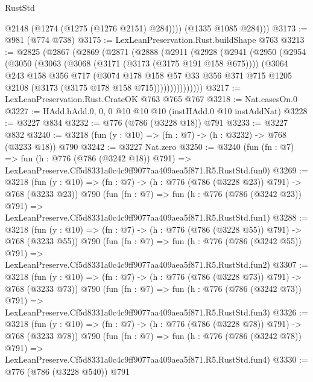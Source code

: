 \begin{lexlean}{RustStd}
\begin{coremodule}
            @2148
            (@1274 (@1275 (@1276 @2151) @284))))
        (@1335 @1085 @284)))
@3173 := @981 (@774 @738)
@3175 := LexLeanPreservation.Rust.buildShape @763
@3213 := @2825
    (@2867
      (@2869
        (@2871
          (@2888
            (@2911
              (@2928
                (@2941
                  (@2950
                    (@2954
                      (@3050
                        (@3063
                          (@3068 (@3171 (@3173 (@3175 @191 @158 @675))))
                          (@3064
                            @243
                            @158
                            @356
                            @717
                            (@3074
                              @178
                              @158
                              @57
                              @33
                              @356
                              @371
                              @715
                              @1205
                              @2108
                              (@3173 (@3175 @178 @158 @715)))))))))))))))
@3217 := LexLeanPreservation.Rust.CrateOK @763 @765 @767
@3218 := Nat.casesOn.{0}
@3227 := HAdd.hAdd.{0, 0, 0} @10 @10 @10 (instHAdd.{0} @10 instAddNat)
@3228 := @3227 @834
@3232 := @776 (@786 (@3228 @18)) @791
@3233 := @3227 @832
@3240 := @3218 (fun (y : @10) => (fn : @7) -> (h : @3232) -> @768 (@3233 @18)) @790
@3242 := @3227 Nat.zero
@3250 := @3240
    (fun (fn : @7) =>
    fun (h : @776 (@786 (@3242 @18)) @791) =>
    LexLeanPreserve.Cf5d8331a0c4c9ff9077aa409aea5f871.R5.RustStd.fun0)
@3269 := @3218
    (fun (y : @10) => (fn : @7) -> (h : @776 (@786 (@3228 @23)) @791) -> @768 (@3233 @23))
    @790
    (fun (fn : @7) =>
    fun (h : @776 (@786 (@3242 @23)) @791) =>
    LexLeanPreserve.Cf5d8331a0c4c9ff9077aa409aea5f871.R5.RustStd.fun1)
@3288 := @3218
    (fun (y : @10) => (fn : @7) -> (h : @776 (@786 (@3228 @55)) @791) -> @768 (@3233 @55))
    @790
    (fun (fn : @7) =>
    fun (h : @776 (@786 (@3242 @55)) @791) =>
    LexLeanPreserve.Cf5d8331a0c4c9ff9077aa409aea5f871.R5.RustStd.fun2)
@3307 := @3218
    (fun (y : @10) => (fn : @7) -> (h : @776 (@786 (@3228 @73)) @791) -> @768 (@3233 @73))
    @790
    (fun (fn : @7) =>
    fun (h : @776 (@786 (@3242 @73)) @791) =>
    LexLeanPreserve.Cf5d8331a0c4c9ff9077aa409aea5f871.R5.RustStd.fun3)
@3326 := @3218
    (fun (y : @10) => (fn : @7) -> (h : @776 (@786 (@3228 @78)) @791) -> @768 (@3233 @78))
    @790
    (fun (fn : @7) =>
    fun (h : @776 (@786 (@3242 @78)) @791) =>
    LexLeanPreserve.Cf5d8331a0c4c9ff9077aa409aea5f871.R5.RustStd.fun4)
@3330 := @776 (@786 (@3228 @540)) @791

\end{coremodule}
\end{lexlean}
